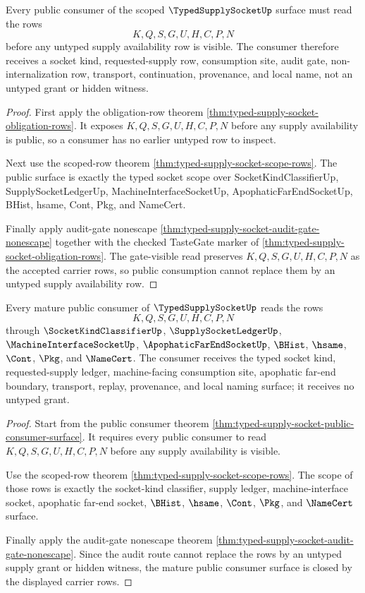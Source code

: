 \begin{theorem}
\label{thm:typed-supply-socket-public-consumer-surface}
Every public consumer of the scoped $\TypedSupplySocketUp$ surface must read the rows
$$
K,Q,S,G,U,H,C,P,N
$$
before any untyped supply availability row is visible. The consumer therefore receives a socket kind, requested-supply row, consumption site, audit gate, non-internalization row, transport, continuation, provenance, and local name, not an untyped grant or hidden witness.
\end{theorem}
\begin{proof}
First apply the obligation-row theorem \autoref{thm:typed-supply-socket-obligation-rows}. It exposes $K,Q,S,G,U,H,C,P,N$ before any supply availability is public, so a consumer has no earlier untyped row to inspect.

Next use the scoped-row theorem \autoref{thm:typed-supply-socket-scope-rows}. The public surface is exactly the typed socket scope over SocketKindClassifierUp, SupplySocketLedgerUp, MachineInterfaceSocketUp, ApophaticFarEndSocketUp, BHist, hsame, Cont, Pkg, and NameCert.

Finally apply audit-gate nonescape \autoref{thm:typed-supply-socket-audit-gate-nonescape} together with the checked TasteGate marker of \autoref{thm:typed-supply-socket-obligation-rows}. The gate-visible read preserves $K,Q,S,G,U,H,C,P,N$ as the accepted carrier rows, so public consumption cannot replace them by an untyped supply availability row.
\end{proof}

\begin{theorem}
\label{thm:typedsupplysocket-mature-public-surface}
Every mature public consumer of $\TypedSupplySocketUp$ reads the rows
$$
K,Q,S,G,U,H,C,P,N
$$
through $\SocketKindClassifierUp$, $\SupplySocketLedgerUp$, $\MachineInterfaceSocketUp$, $\ApophaticFarEndSocketUp$, $\BHist$, $\hsame$, $\Cont$, $\Pkg$, and $\NameCert$. The consumer receives the typed socket kind, requested-supply ledger, machine-facing consumption site, apophatic far-end boundary, transport, replay, provenance, and local naming surface; it receives no untyped grant.
\end{theorem}
\begin{proof}
Start from the public consumer theorem \autoref{thm:typed-supply-socket-public-consumer-surface}. It requires every public consumer to read $K,Q,S,G,U,H,C,P,N$ before any supply availability is visible.

Use the scoped-row theorem \autoref{thm:typed-supply-socket-scope-rows}. The scope of those rows is exactly the socket-kind classifier, supply ledger, machine-interface socket, apophatic far-end socket, $\BHist$, $\hsame$, $\Cont$, $\Pkg$, and $\NameCert$ surface.

Finally apply the audit-gate nonescape theorem \autoref{thm:typed-supply-socket-audit-gate-nonescape}. Since the audit route cannot replace the rows by an untyped supply grant or hidden witness, the mature public consumer surface is closed by the displayed carrier rows.
\end{proof}

